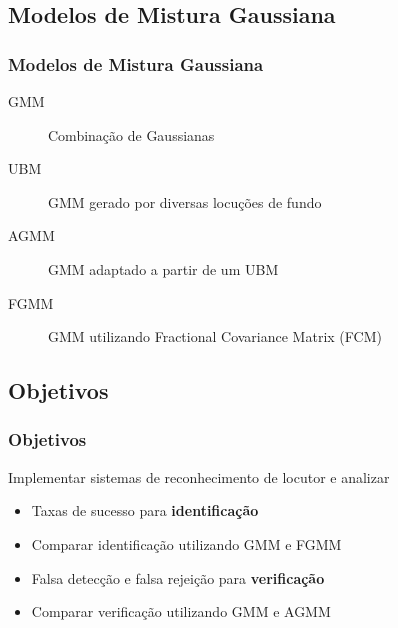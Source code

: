 \subsection{Modelos de Mistura Gaussiana}

\begin{frame}
\frametitle{Modelos de Mistura Gaussiana}
\begin{description}
    \item[GMM] Combinação de Gaussianas
    \pause
    \item[UBM] GMM gerado por diversas locuções de fundo
    \pause
    \item[AGMM] GMM adaptado a partir de um UBM
    \pause
    \item[FGMM] GMM utilizando Fractional Covariance Matrix (FCM)
\end{description}
\end{frame}

\subsection{Objetivos}

\begin{frame}
\frametitle{Objetivos}
\begin{description}
    \item Implementar sistemas de reconhecimento de locutor e analizar
    \pause
    \begin{itemize}
        \item Taxas de sucesso para \textbf{identificação}
        \pause
        \item Comparar identificação utilizando GMM e FGMM
        \pause
        \item Falsa detecção e falsa rejeição para \textbf{verificação}
        \pause
        \item Comparar verificação utilizando GMM e AGMM
    \end{itemize}
\end{description}
\end{frame}